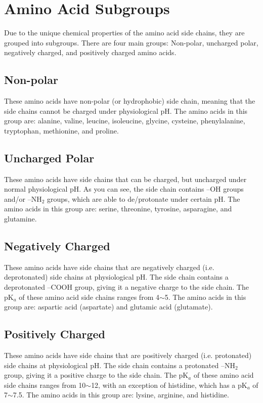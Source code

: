 \section{Amino Acid Subgroups}

Due to the unique chemical properties of the amino acid side chains, they are grouped into subgroups.
There are four main groups: Non-polar, uncharged polar, negatively charged, and positively charged amino acids.

\subsection{Non-polar}

These amino acids have non-polar (or hydrophobic) side chain, meaning that the side chains cannot be charged under physiological pH.
The amino acids in this group are: alanine, valine, leucine, isoleucine, glycine, cysteine, phenylalanine, tryptophan, methionine, and proline.

\subsection{Uncharged Polar}

These amino acids have side chains that can be charged, but uncharged under normal physiological pH.
As you can see, the side chain contains --OH groups and/or --NH$_2$ groups, which are able to de/protonate under certain pH.
The amino acids in this group are: serine, threonine, tyrosine, asparagine, and glutamine.


\subsection{Negatively Charged}

These amino acids have side chains that are negatively charged (i.e. deprotonated) side chains at physiological pH.
The side chain contains a deprotonated --COOH group, giving it a negative charge to the side chain.
The pK$_a$ of these amino acid side chains ranges from 4$\sim$5.
The amino acids in this group are: aspartic acid (aspartate) and glutamic acid (glutamate).

\subsection{Positively Charged}

These amino acids have side chains that are positively charged (i.e. protonated) side chains at physiological pH.
The side chain contains a protonated --NH$_2$ group, giving it a positive charge to the side chain.
The pK$_a$ of these amino acid side chains ranges from 10$\sim$12, with an exception of histidine, which has a pK$_a$ of 7$\sim$7.5.
The amino acids in this group are: lysine, arginine, and histidine.


